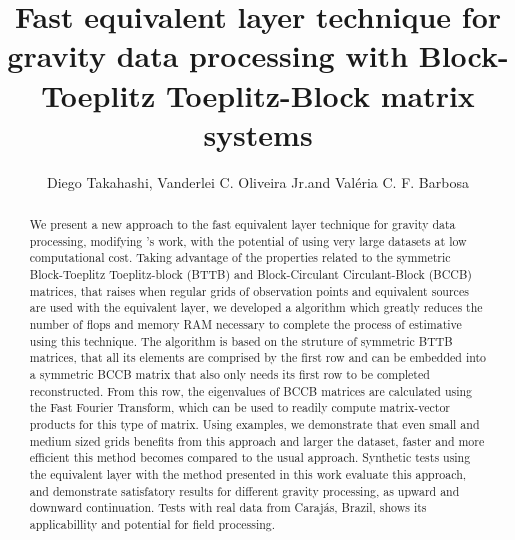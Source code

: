 \documentclass[paper]{geophysics}
\begin{document}
\title{Fast equivalent layer technique for gravity data processing with Block-Toeplitz Toeplitz-Block matrix systems}

\renewcommand{\thefootnote}{\fnsymbol{footnote}} 


\address{
\footnotemark[1]Observat\'orio Nacional, \\
77 General Jos\'e Cristino Av., \\
Rio de Janeiro, RJ, 20921400 \\
}
\author{Diego Takahashi\footnotemark[1], Vanderlei C. Oliveira Jr.\footnotemark[1] and Val\'eria
	C. F. Barbosa\footnotemark[1]}


\maketitle

\begin{abstract}
We present a new approach to the fast equivalent layer technique for gravity data processing, modifying \cite{siqueira2017fast}'s work, with the potential of using very large datasets at low computational cost. Taking advantage of the properties related to the symmetric Block-Toeplitz Toeplitz-block (BTTB) and Block-Circulant Circulant-Block (BCCB) matrices, that raises when regular grids of observation points and equivalent sources are used with the equivalent layer, we developed a algorithm which greatly reduces the number of flops and memory RAM necessary to complete the process of estimative using this technique. The algorithm is based on the struture of symmetric BTTB matrices, that all its elements are comprised by the first row and can be embedded into a symmetric BCCB matrix that also only needs its first row to be completed reconstructed. From this row, the eigenvalues of BCCB matrices are calculated using the Fast Fourier Transform, which can be used to readily compute matrix-vector products for this type of matrix. Using examples, we demonstrate that even small and medium sized grids benefits from this approach and larger the dataset, faster and more efficient this method becomes compared to the usual approach. Synthetic tests using the equivalent layer with the method presented in this work evaluate this approach, and demonstrate satisfatory results for different gravity processing, as upward and downward continuation. Tests with real data from Caraj\'as, Brazil, shows its applicabillity and potential for field processing.
\end{abstract}
\end{document}
